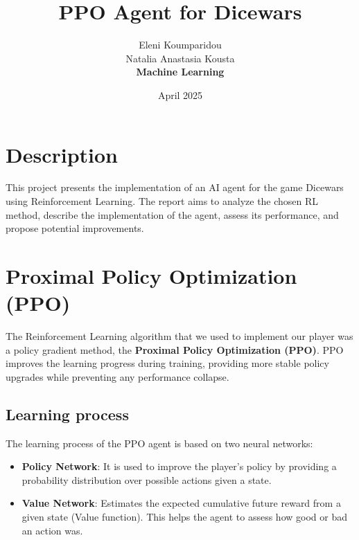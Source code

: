 \documentclass{article}
\title{PPO Agent for Dicewars}
\author{Eleni Koumparidou\\ Natalia Anastasia Kousta\\
\textbf{Machine Learning}}
\date{April 2025}
\begin{document}
\maketitle

\section{Description}
This project presents the implementation of an AI agent for the game Dicewars using Reinforcement Learning. The report aims to analyze the chosen RL method, describe the implementation of the agent, assess its performance, and propose potential improvements.

\section{Proximal Policy Optimization (PPO)}
The Reinforcement Learning algorithm that we used to implement our player was a policy gradient method, the \textbf{Proximal Policy Optimization (PPO)}. PPO improves the learning progress during training, providing more stable policy upgrades while preventing any performance collapse.

\subsection{Learning process}
The learning process of the PPO agent is based on two neural networks:

\begin{itemize}
    \item \textbf{Policy Network}: It is used to improve the player's policy by providing a probability distribution over possible actions given a state.
    
    \item \textbf{Value Network}: Estimates the expected cumulative future reward from a given state (Value function). This helps the agent to assess how good or bad an action was.
\end{itemize}
\end{document}
